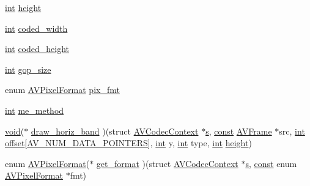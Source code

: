 \begin{DoxyCompactItemize}
\item 
\hyperlink{xmltok_8h_a5a0d4a5641ce434f1d23533f2b2e6653}{int} \hyperlink{struct_a_v_codec_context_a0449afd803eb107bd4dbc8b5ea22e363}{height}
\item 
\hyperlink{xmltok_8h_a5a0d4a5641ce434f1d23533f2b2e6653}{int} \hyperlink{struct_a_v_codec_context_ae3c157e97ff15d46e898a538c6bc7f09}{coded\+\_\+width}
\item 
\hyperlink{xmltok_8h_a5a0d4a5641ce434f1d23533f2b2e6653}{int} \hyperlink{struct_a_v_codec_context_ab2ebb76836ef4cd9822b5077c17b33d0}{coded\+\_\+height}
\item 
\hyperlink{xmltok_8h_a5a0d4a5641ce434f1d23533f2b2e6653}{int} \hyperlink{struct_a_v_codec_context_a9b6b3f1fcbdcc2ad9f4dbb4370496e38}{gop\+\_\+size}
\item 
enum \hyperlink{pixfmt_8h_a9a8e335cf3be472042bc9f0cf80cd4c5}{A\+V\+Pixel\+Format} \hyperlink{struct_a_v_codec_context_a0425c77b3d06d71e5db88b1d7e1b37f2}{pix\+\_\+fmt}
\item 
\hyperlink{xmltok_8h_a5a0d4a5641ce434f1d23533f2b2e6653}{int} \hyperlink{struct_a_v_codec_context_ae969fc4cb4ac9ca5c61f7f7c6f78e14d}{me\+\_\+method}
\item 
\hyperlink{sound_8c_ae35f5844602719cf66324f4de2a658b3}{void}($\ast$ \hyperlink{struct_a_v_codec_context_a692cb615f8045df330ec0a12852b5252}{draw\+\_\+horiz\+\_\+band} )(struct \hyperlink{struct_a_v_codec_context}{A\+V\+Codec\+Context} $\ast$\hyperlink{lib_2expat_8h_a755339d27872b13735c2cab829e47157}{s}, \hyperlink{getopt1_8c_a2c212835823e3c54a8ab6d95c652660e}{const} \hyperlink{struct_a_v_frame}{A\+V\+Frame} $\ast$src, \hyperlink{xmltok_8h_a5a0d4a5641ce434f1d23533f2b2e6653}{int} \hyperlink{layer12_8c_a33d71f23ba2052d17f0b754dc35265b0}{offset}\mbox{[}\hyperlink{ffmpeg_2libavutil_2frame_8h_add80189702cf0f5ea82718576fb43201}{A\+V\+\_\+\+N\+U\+M\+\_\+\+D\+A\+T\+A\+\_\+\+P\+O\+I\+N\+T\+E\+RS}\mbox{]}, \hyperlink{xmltok_8h_a5a0d4a5641ce434f1d23533f2b2e6653}{int} y, \hyperlink{xmltok_8h_a5a0d4a5641ce434f1d23533f2b2e6653}{int} type, \hyperlink{xmltok_8h_a5a0d4a5641ce434f1d23533f2b2e6653}{int} \hyperlink{struct_a_v_codec_context_a0449afd803eb107bd4dbc8b5ea22e363}{height})
\item 
enum \hyperlink{pixfmt_8h_a9a8e335cf3be472042bc9f0cf80cd4c5}{A\+V\+Pixel\+Format}($\ast$ \hyperlink{struct_a_v_codec_context_a360a2b8508a67c4234d97f4c13ba1bb5}{get\+\_\+format} )(struct \hyperlink{struct_a_v_codec_context}{A\+V\+Codec\+Context} $\ast$\hyperlink{lib_2expat_8h_a755339d27872b13735c2cab829e47157}{s}, \hyperlink{getopt1_8c_a2c212835823e3c54a8ab6d95c652660e}{const} enum \hyperlink{pixfmt_8h_a9a8e335cf3be472042bc9f0cf80cd4c5}{A\+V\+Pixel\+Format} $\ast$fmt)

\end{DoxyCompactItemize}
